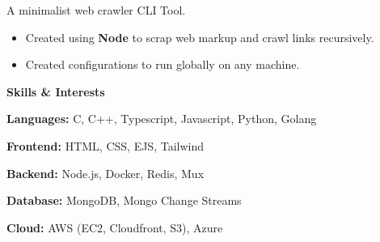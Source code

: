 \documentclass[11pt]{article}
\begin{document}
A minimalist web crawler CLI Tool.

\begin{itemize}[noitemsep]
    
    \item Created using \textbf{Node} to scrap web markup and crawl links recursively.
    \item Created configurations to run globally on any machine.
\end{itemize}

\begin{center}
    \textbf{Skills \& Interests}
\end{center}

\textbf{Languages:} C, C++, Typescript, Javascript, Python, Golang

\textbf{Frontend:} HTML, CSS, EJS, Tailwind

\textbf{Backend:} Node.js, Docker, Redis, Mux

\textbf{Database:} MongoDB, Mongo Change Streams

\textbf{Cloud:} AWS (EC2, Cloudfront, S3), Azure
\end{document}
